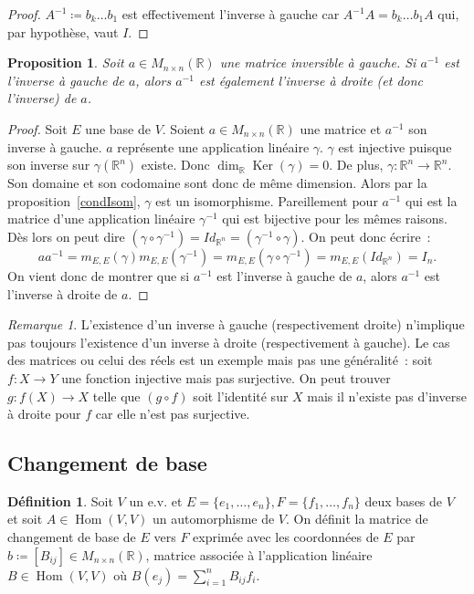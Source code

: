 \documentclass{article}
\DeclareMathOperator{\Ker}{Ker}
\DeclareMathOperator{\Hom}{Hom}
\newcommand{\R}{\mathbb R}
\newcommand{\M}[3]{M_{#1 \times #2}(#3)}
\newtheorem{prp}[thm]{Proposition}
\theoremstyle{definition}
\newtheorem{déf}[thm]{Définition}
\theoremstyle{remark}
\newtheorem*{rmq}{Remarque}
\begin{document}
		\begin{proof} $A^{-1} \coloneqq b_k\ldots b_1$ est effectivement l'inverse à gauche car $A^{-1}A = b_k\ldots b_1A$ qui, par hypothèse, vaut $I$. \end{proof}

		\begin{prp} Soit $a \in \M nn\R$ une matrice inversible à gauche. Si $a^{-1}$ est l'inverse à gauche de $a$, alors $a^{-1}$ est également l'inverse à droite
		(et donc l'inverse) de $a$. \end{prp}

		\begin{proof} Soit $E$ une base de $V$. Soient $a \in \M nn\R$ une matrice et $a^{-1}$ son inverse à gauche. $a$ représente une application linéaire $\gamma$.
		$\gamma$ est injective puisque son inverse sur $\gamma(\R^n)$ existe. Donc $\dim_\R\Ker(\gamma) = 0$. De plus, $\gamma : \R^n \to \R^n$. Son domaine et son
		codomaine sont donc de même dimension. Alors par la proposition~\ref{condIsom}, $\gamma$ est un isomorphisme. Pareillement pour $a^{-1}$ qui est la matrice d'une
		application linéaire $\gamma^{-1}$ qui est bijective pour les mêmes raisons. Dès lors on peut dire
		$(\gamma \circ \gamma^{-1}) = Id_{\R^n} = (\gamma^{-1} \circ \gamma)$. On peut donc écrire~:
		\[aa^{-1} = m_{E, E}(\gamma)m_{E, E}(\gamma^{-1}) = m_{E, E}(\gamma \circ \gamma^{-1}) = m_{E, E}(Id_{\R^n}) = I_n.\]
		On vient donc de montrer que si $a^{-1}$ est l'inverse à gauche de $a$, alors $a^{-1}$ est l'inverse à droite de $a$. \end{proof}

		\begin{rmq} L'existence d'un inverse à gauche (respectivement droite) n'implique pas toujours l'existence d'un inverse à droite (respectivement à gauche).
		Le cas des matrices ou celui des réels est un exemple mais pas une généralité~: soit $f : X \to Y$ une fonction injective mais pas surjective. On peut trouver
		$g : f(X) \to X$ telle que $(g \circ f)$ soit l'identité sur $X$ mais il n'existe pas d'inverse à droite pour $f$ car elle n'est pas surjective. \end{rmq}

	\subsection{Changement de base}
		\begin{déf} Soit $V$ un e.v. et $E = \{e_1, \dotsc, e_n\}, F = \{f_1, \dotsc, f_n\}$ deux bases de $V$ et soit $A \in \Hom(V, V)$ un automorphisme de $V$.
		On définit la matrice de changement de base de $E$ vers $F$ exprimée avec les coordonnées de $E$ par $b \coloneqq [B_{ij}] \in \M nn\R$, matrice associée à
		l'application linéaire $B \in \Hom(V, V)$ où $B(e_j) = \sum_{i=1}^nB_{ij}f_i$. \end{déf}
\end{document}
